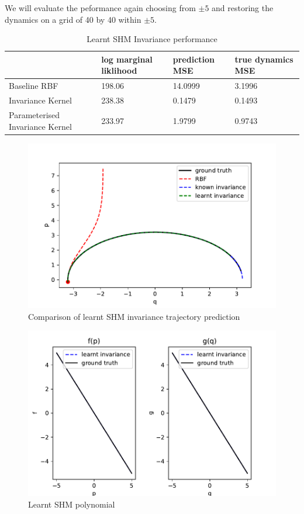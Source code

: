 \documentclass{statsmsc}
\begin{document}
We will evaluate the peformance again choosing from $\pm 5$ and restoring the dynamics on a grid of 40 by 40 within $\pm 5$.
\begin{table}[H]
  \centering
  \begin{tabular}{l l l l} 
                    \hline
                    & log marginal liklihood &  prediction MSE  & true dynamics MSE\\
                    \hline
Baseline RBF & 198.06 & 14.0999 & 3.1996 \\
Invariance Kernel & 238.38 & 0.1479 & 0.1493 \\
Parameterised Invariance Kernel & 233.97 & 1.9799 & 0.9743 \\
                    \hline
  \end{tabular}
  \caption{Learnt SHM Invariance performance }
  \label{tab:paramertised_shm_performance}
\end{table}

\begin{figure}[H] 
  \includegraphics[width=0.6\linewidth]{../codes/figures/parameterised_shm_predicted_trajectory.pdf}
  \centering
  \caption{Comparison of learnt SHM invariance trajectory prediction}
  \label{fig:parameterised_shm_trajectory}
\end{figure}

\begin{figure}[H] 
  \includegraphics[width=0.6\linewidth]{../codes/figures/parameterised_shm_learnt_polynomial.pdf}
  \centering
  \caption{Learnt SHM polynomial}
  \label{fig:parameterised_shm_polynomial}
\end{figure}
\end{document}
